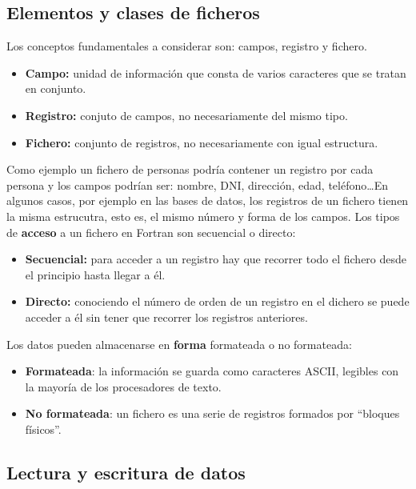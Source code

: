 \subsection{Elementos y clases de ficheros}

Los conceptos fundamentales a considerar son: campos, registro y fichero. 

\begin{itemize}
	\item \textbf{Campo:} unidad de información que consta de varios caracteres que se tratan en conjunto.
	\item \textbf{Registro:} conjuto de campos, no necesariamente del mismo tipo.
	\item \textbf{Fichero:} conjunto de registros, no necesariamente con igual estructura.
\end{itemize}
Como ejemplo un fichero de personas podría contener un registro por cada persona y los campos podrían ser: nombre, DNI, dirección, edad, teléfono\dots En algunos casos, por ejemplo en las bases de datos, los registros de un fichero tienen la misma estrucutra, esto es, el mismo número y forma de los campos. Los tipos de {\bf acceso} a un fichero en Fortran son secuencial o directo:

\begin{itemize}
	\item \textbf{Secuencial:} para acceder a un registro hay que recorrer todo el fichero desde el principio hasta llegar a él.
	\item \textbf{Directo:} conociendo el número de orden de un registro en el dichero se puede acceder a él sin tener que recorrer los registros anteriores.
\end{itemize}

Los datos pueden almacenarse en \textbf{forma} formateada o no formateada:

\begin{itemize}
	\item \textbf{Formateada}: la información se guarda como caracteres ASCII, legibles con la mayoría de los procesadores de texto.
	\item \textbf{No formateada}: un fichero es una serie de registros formados por ``bloques físicos''.
\end{itemize}

\subsection{Lectura y escritura de datos}

